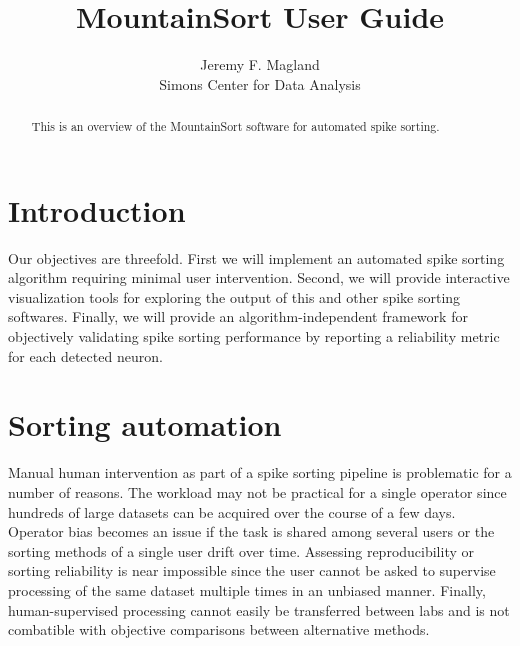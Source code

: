 \documentclass[10pt]{article}
\begin{document}
\def\spacingset#1{\renewcommand{\baselinestretch}%
{#1}\small\normalsize} \spacingset{1}



\title{\bf MountainSort User Guide}
\author{Jeremy F. Magland\hspace{.2cm}\\
  Simons Center for Data Analysis\\
  }
\maketitle

\bigskip
\begin{abstract}
This is an overview of the MountainSort software for automated spike sorting.
\end{abstract}

\vfill

\newpage

\section {Introduction}

Our objectives are threefold. First we will implement an automated spike sorting algorithm requiring minimal user intervention. Second, we will provide interactive visualization tools for exploring the output of this and other spike sorting softwares. Finally, we will provide an algorithm-independent framework for objectively validating spike sorting performance by reporting a reliability metric for each detected neuron.

\section {Sorting automation}

Manual human intervention as part of a spike sorting pipeline is problematic for a number of reasons. The workload may not be practical for a single operator since hundreds of large datasets can be acquired over the course of a few days. Operator bias becomes an issue if the task is shared among several users or the sorting methods of a single user drift over time. Assessing reproducibility or sorting reliability is near impossible since the user cannot be asked to supervise processing of the same dataset multiple times in an unbiased manner. Finally, human-supervised processing cannot easily be transferred between labs and is not combatible with objective comparisons between alternative methods. 
\end{document}
